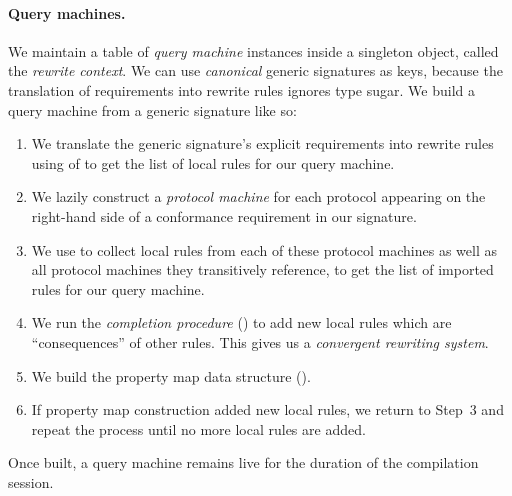 \documentclass[../generics]{subfiles}
\begin{document}
\paragraph{Query machines.}
We maintain a table of \emph{query machine} instances inside a singleton object, called the \emph{rewrite context}. We can use \emph{canonical} generic signatures as keys, because the translation of requirements into rewrite rules ignores type sugar. We build a query machine from a generic signature like so:
\begin{enumerate}
\item We translate the generic signature's explicit requirements into rewrite rules using  of  to get the list of local rules for our query machine.

\item We lazily construct a \emph{protocol machine} for each protocol appearing on the right-hand side of a conformance requirement in our signature.

\item We use  to collect local rules from each of these protocol machines as well as all protocol machines they transitively reference, to get the list of imported rules for our query machine.

\item We run the \emph{completion procedure} () to add new local rules which are ``consequences'' of other rules. This gives us a \emph{convergent rewriting system}.

\item We build the property map data structure (). 

\item If property map construction added new local rules, we return to Step~3 and repeat the process until no more local rules are added.
\end{enumerate}
Once built, a query machine remains live for the duration of the compilation session. 
\end{document}
